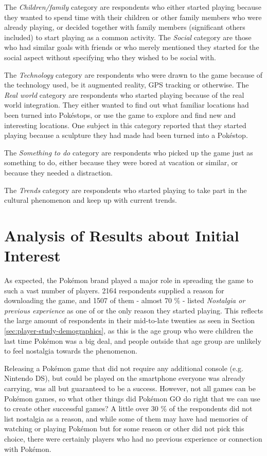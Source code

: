 The \emph{Children/family} category are respondents who either started playing because they wanted to spend time with their children or other family members who were already playing, or decided together with family members (significant others included) to start playing as a common activity. The \emph{Social} category are those who had similar goals with friends or who merely mentioned they started for the social aspect without specifying who they wished to be social with.

The \emph{Technology} category are respondents who were drawn to the game because of the technology used, be it augmented reality, GPS tracking or otherwise. The \emph{Real world} category are respondents who started playing because of the real world integration. They either wanted to find out what familiar locations had been turned into Pokéstops, or use the game to explore and find new and interesting locations. One subject in this category reported that they started playing because a sculpture they had made had been turned into a Pokéstop.

The \emph{Something to do} category are respondents who picked up the game just as something to do, either because they were bored at vacation or similar, or because they needed a distraction.

The \emph{Trends} category are respondents who started playing to take part in the cultural phenomenon and keep up with current trends.

\section{Analysis of Results about Initial Interest}
\label{sec:success-factors-initial-interest-analysis}

As expected, the Pokémon brand played a major role in spreading the game to such a vast number of players. 2164 respondents supplied a reason for downloading the game, and 1507 of them - almost 70 \% - listed \emph{Nostalgia or previous experience} as one of or the only reason they started playing. This reflects the large amount of respondents in their mid-to-late twenties as seen in Section \ref{sec:player-study-demographics}, as this is the age group who were children the last time Pokémon was a big deal, and people outside that age group are unlikely to feel nostalgia towards the phenomenon.

Releasing a Pokémon game that did not require any additional console (e.g. Nintendo DS), but could be played on the smartphone everyone was already carrying, was all but guaranteed to be a success. However, not all games can be Pokémon games, so what other things did Pokémon GO do right that we can use to create other successful games? A little over 30 \% of the respondents did not list nostalgia as a reason, and while some of them may have had memories of watching or playing Pokémon but for some reason or other did not pick this choice, there were certainly players who had no previous experience or connection with Pokémon.


